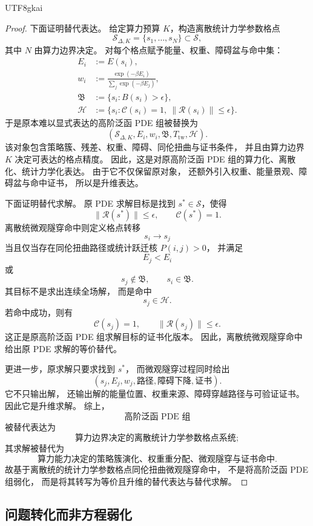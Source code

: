 \documentclass[12pt]{article}
\begin{document}
\begin{CJK*}{UTF8}{gkai}
\begin{proof}
下面证明替代表达。
给定算力预算 \(K\)，构造离散统计力学参数格点
\[
  \mathcal S_{\Delta,K}
  =
  \{s_1,\ldots,s_N\}
  \subset
  \mathcal S,
\]
其中 \(N\) 由算力边界决定。
对每个格点赋予能量、权重、障碍盆与命中集：
\[
\begin{aligned}
  E_i
  &:=
  E(s_i),\\
  w_i
  &:=
  \frac{\exp(-\beta E_i)}
       {\sum_j\exp(-\beta E_j)},\\
  \mathfrak B
  &:=
  \{s_i:B(s_i)>\epsilon\},\\
  \mathcal H
  &:=
  \{s_i:\mathcal C(s_i)=1,\ \|\mathcal R(s_i)\|\le\epsilon\}.
\end{aligned}
\]
于是原本难以显式表达的高阶泛函 PDE 组被替换为
\[
  (
    \mathcal S_{\Delta,K},
    E_i,
    w_i,
    \mathfrak B,
    T_{\mathrm{tw}},
    \mathcal H
  ).
\]
该对象包含策略簇、残差、权重、障碍、同伦扭曲与证书条件，
并且由算力边界 \(K\) 决定可表达的格点精度。
因此，这是对原高阶泛函 PDE 组的算力化、离散化、统计力学化表达。
由于它不仅保留原对象，
还额外引入权重、能量景观、障碍盆与命中证书，
所以是升维表达。

下面证明替代求解。
原 PDE 求解目标是找到 \(s^\ast\in\mathcal S\)，使得
\[
  \|\mathcal R(s^\ast)\|\le\epsilon,
  \qquad
  \mathcal C(s^\ast)=1.
\]
离散统微观隧穿命中则定义格点转移
\[
  s_i\to s_j
\]
当且仅当存在同伦扭曲路径或统计跃迁核 \(P(i,j)>0\)，
并满足
\[
  E_j<E_i
\]
或
\[
  s_j\notin\mathfrak B,
  \qquad
  s_i\in\mathfrak B.
\]
其目标不是求出连续全场解，
而是命中
\[
  s_j\in\mathcal H.
\]
若命中成功，则有
\[
  \mathcal C(s_j)=1,
  \qquad
  \|\mathcal R(s_j)\|\le\epsilon.
\]
这正是原高阶泛函 PDE 组求解目标的证书化版本。
因此，离散统微观隧穿命中给出原 PDE 求解的等价替代。

更进一步，原求解只要求找到 \(s^\ast\)，
而微观隧穿过程同时给出
\[
  (s_j,E_j,w_j,\text{路径},\text{障碍下降},\text{证书}).
\]
它不只输出解，
还输出解的能量位置、权重来源、障碍穿越路径与可验证证书。
因此它是升维求解。
综上，
\[
  \text{高阶泛函 PDE 组}
\]
被替代表达为
\[
  \text{算力边界决定的离散统计力学参数格点系统};
\]
其求解被替代为
\[
  \text{算力能力决定的策略簇演化、权重重分配、微观隧穿与证书命中}.
\]
故基于离散统的统计力学参数格点同伦扭曲微观隧穿命中，
不是将高阶泛函 PDE 组弱化，
而是将其转写为等价且升维的替代表达与替代求解。
\end{proof}

\subsection{问题转化而非方程弱化}
\label{subsec:tex53-not-weakening}


\end{CJK*}
\end{document}
